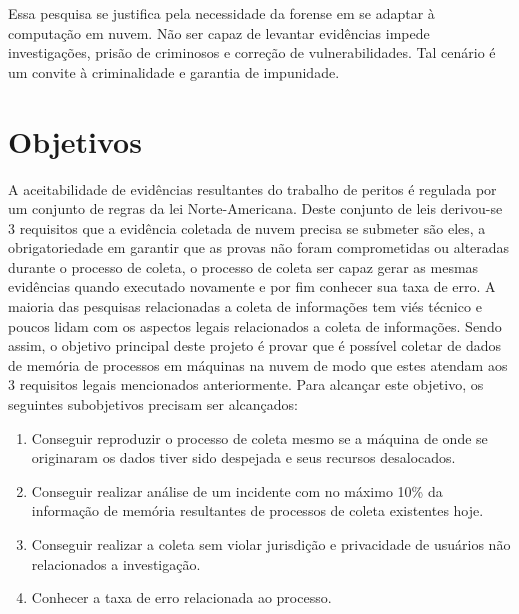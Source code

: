 \documentclass[12pt,				%
	openright,			%
	oneside,			%
	a4paper,			%
	english,			%
	brazil				%
	]{abntex2}
\begin{document}
Essa pesquisa se justifica pela necessidade da forense em se adaptar à computação em nuvem. Não ser capaz de levantar evidências impede investigações, prisão de criminosos e 
correção de vulnerabilidades. Tal cenário é um convite à criminalidade e garantia de impunidade.

\chapter{Objetivos} \label{chap:obj}
A aceitabilidade de evidências resultantes do trabalho de peritos é regulada por um conjunto de regras da lei Norte-Americana. Deste conjunto de leis derivou-se 3 requisitos que
a evidência coletada de nuvem precisa se submeter são eles, a obrigatoriedade em garantir que as provas não foram comprometidas ou alteradas durante o processo de coleta, o processo
de coleta ser capaz gerar as mesmas evidências quando executado novamente e por fim conhecer sua taxa de erro. A maioria das pesquisas relacionadas a coleta de informações tem viés
técnico e poucos lidam com os aspectos legais relacionados a coleta de informações. Sendo assim, o objetivo principal deste projeto é provar que é possível coletar de dados de 
memória de processos em máquinas na nuvem de modo que estes atendam aos 3 requisitos legais mencionados anteriormente. Para alcançar este objetivo, os seguintes subobjetivos 
precisam ser alcançados:

\begin{enumerate}
 \item Conseguir reproduzir o processo de coleta mesmo se a máquina de onde se originaram os dados tiver sido despejada e seus recursos desalocados.
 \item Conseguir realizar análise de um incidente com no máximo 10\% da informação de memória resultantes de processos de coleta existentes hoje.
 \item Conseguir realizar a coleta sem violar jurisdição e privacidade de usuários não relacionados a investigação.
 \item Conhecer a taxa de erro relacionada ao processo.
\end{enumerate}
\end{document}
